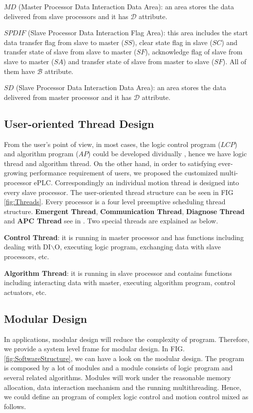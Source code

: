 \documentclass[journal,UTF8]{IEEEtran}
\begin{document}
\textbf{$MD$} (Master Processor Data Interaction Data Area): an area stores the data delivered from slave processors and it has $\mathcal{D}$ attribute.

\textbf{$SPDIF$} (Slave Processor Data Interaction Flag Area): this area includes the start data transfer flag from slave to master ($SS$), clear state flag in slave ($SC$) and transfer state of slave from slave to master ($SF$), acknowledge flag of slave from slave to master ($SA$) and transfer state of slave from master to slave ($SF$). All of them have $\mathcal{B}$ attribute.

\textbf{$SD$} (Slave Processor Data Interaction Data Area): an area stores the data delivered from master processor and it has $\mathcal{D}$ attribute.

\subsection{User-oriented Thread Design}
From the user's point of view, in most cases, the logic control program ($LCP$) and algorithm program ($AP$) could be developed dividually \cite{WuA}, hence we have logic thread and algorithm thread. On the other hand, in order to satisfying ever-growing performance requirement of users, we proposed the customized multi-processor ePLC. Correspondingly 
an individual motion thread is designed into every slave processor. The user-oriented thread structure can be seen in FIG \ref{fig:Threads}. Every processor is a four level preemptive scheduling thread structure. \textbf{Emergent Thread}, \textbf{Communication Thread}, \textbf{Diagnose Thread} and \textbf{APC Thread} see in \cite{WuA}. Two special threads are explained as below.

\textbf{Control Thread}: it is running in master processor and has functions including dealing with DI$\backslash$O, executing logic program, exchanging data with slave processors, etc.

\textbf{Algorithm Thread}: it is running in slave processor and contains functions including interacting data with master, executing algorithm program, control actuators, etc.

\subsection{Modular Design}  
In applications, modular design will reduce the complexity of program. Therefore, we provide a system level frame for modular design. In FIG. \ref{fig:SoftwareStructure}, we can have a look on the modular design. The program is composed by a lot of modules and a module consists of logic program and several related algorithms. Modules will work under the reasonable memory allocation, data interaction mechanism and the running multithreading. Hence, we could define an program of complex logic control and motion control mixed as follows.
\end{document}

